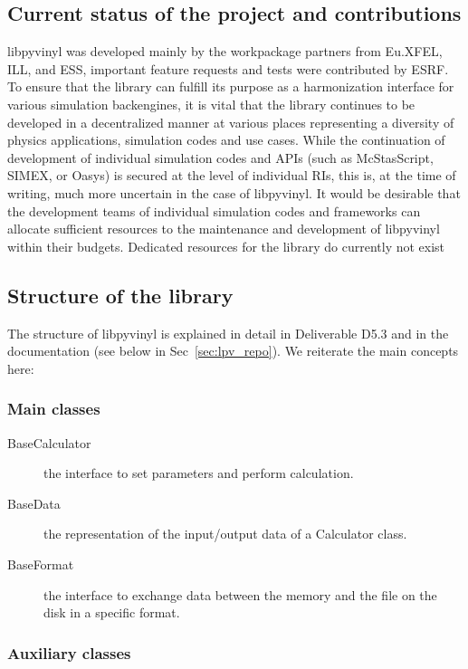 \documentclass[11pt, a4paper]{article}
\begin{document}
\subsection{Current status of the project and contributions}
\label{sec:lpv_status}
libpyvinyl was developed mainly by the workpackage partners from
Eu.XFEL, ILL, and ESS, important feature requests and tests were contributed by
ESRF. To ensure that the library can fulfill its purpose as a harmonization
interface for various simulation backengines, it is vital that the library
continues to be developed in a decentralized manner at various places
representing a diversity of physics applications, simulation codes and use
cases. While the continuation of development of individual simulation codes and
APIs (such as McStasScript, SIMEX, or Oasys) is secured at the level of
individual RIs, this is, at the time of writing, much more uncertain in the case
of libpyvinyl. It would be desirable that the development teams of
individual simulation codes and frameworks can allocate sufficient resources to
the maintenance and development of libpyvinyl within their budgets.
Dedicated resources for the  library do currently not exist

\subsection{Structure of the library}
\label{sec:lpv_structure}
The structure of libpyvinyl is explained in detail in Deliverable D5.3
and in the documentation (see below in Sec~\ref{sec:lpv_repo}). We reiterate the
main concepts here:

\subsubsection{Main classes}
\label{sec:lpv_main_classes}

\begin{description}
\item[BaseCalculator] the interface to set parameters and perform calculation.
\item[BaseData]   the representation of the input/output data of a Calculator class.
\item[BaseFormat]   the interface to exchange data between the memory and the file on the disk in a specific format.
\end{description}

\subsubsection{Auxiliary classes}
\label{sec:lpv_aux}
\end{document}
